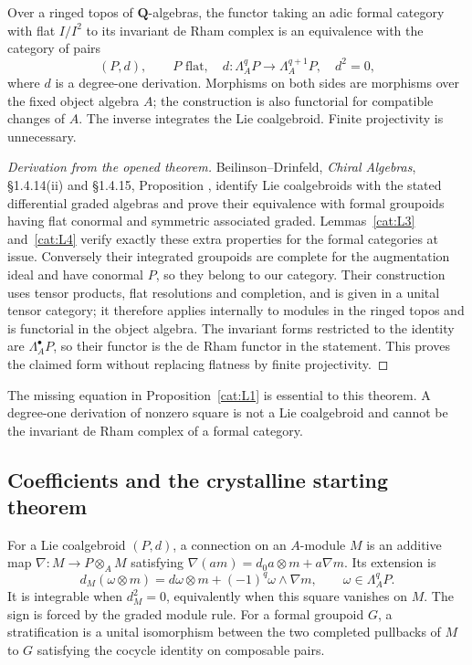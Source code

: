 \begin{theorem}\label{cat:L5}
Over a ringed topos of $\mathbf Q$-algebras, the functor taking an adic
formal category with flat $I/I^2$ to its invariant de Rham complex is
an equivalence with the category of pairs
\[
 (P,d),\qquad P\text{ flat},\quad
 d:\Lambda_A^qP\longrightarrow\Lambda_A^{q+1}P,
 \quad d^2=0,
\]
where $d$ is a degree-one derivation.  Morphisms on both sides are
morphisms over the fixed object algebra $A$; the construction is also
functorial for compatible changes of $A$.  The inverse integrates the
Lie coalgebroid.  Finite projectivity is unnecessary.
\end{theorem}
\begin{proof}[Derivation from the opened theorem]
Beilinson--Drinfeld, \emph{Chiral Algebras},
\S1.4.14(ii) and \S1.4.15, Proposition
\cite{catBeilinsonDrinfeld2004}, identify Lie coalgebroids with the
stated differential graded algebras and prove their equivalence with
formal groupoids having flat conormal and symmetric associated graded.
Lemmas~\ref{cat:L3} and~\ref{cat:L4} verify exactly these extra
properties for the formal categories at issue.  Conversely their
integrated groupoids are complete for the augmentation ideal and have
conormal $P$, so they belong to our category.  Their construction uses
tensor products, flat resolutions and completion, and is given in a
unital tensor category; it therefore applies internally to modules in
the ringed topos and is functorial in the object algebra.  The invariant
forms restricted to the identity are $\Lambda_A^\bullet P$, so their
functor is the de Rham functor in the statement.  This proves the
claimed form without replacing flatness by finite projectivity.
\end{proof}

The missing equation in Proposition~\ref{cat:L1} is essential to this
theorem.  A degree-one derivation of nonzero square is not a Lie
coalgebroid and cannot be the invariant de Rham complex of a formal
category.

\subsection{Coefficients and the crystalline starting theorem}
For a Lie coalgebroid $(P,d)$, a connection on an $A$-module $M$ is an
additive map $\nabla:M\to P\otimes_A M$ satisfying
$\nabla(am)=d_0a\otimes m+a\nabla m$.  Its extension is
\[
 d_M(\omega\otimes m)=d\omega\otimes m+
          (-1)^q\omega\wedge\nabla m,
 \qquad\omega\in\Lambda_A^qP.
\]
It is integrable when $d_M^2=0$, equivalently when this square vanishes
on $M$.  The sign is forced by the graded module rule.
For a formal groupoid $G$, a stratification is a unital isomorphism
between the two completed pullbacks of $M$ to $G$ satisfying the cocycle
identity on composable pairs.


